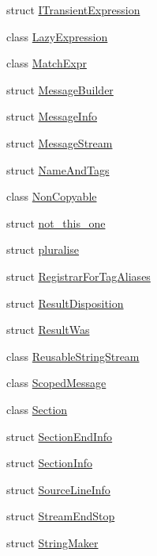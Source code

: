 \begin{DoxyCompactItemize}
\item 
struct \mbox{\hyperlink{struct_catch_1_1_i_transient_expression}{I\+Transient\+Expression}}
\item 
class \mbox{\hyperlink{class_catch_1_1_lazy_expression}{Lazy\+Expression}}
\item 
class \mbox{\hyperlink{class_catch_1_1_match_expr}{Match\+Expr}}
\item 
struct \mbox{\hyperlink{struct_catch_1_1_message_builder}{Message\+Builder}}
\item 
struct \mbox{\hyperlink{struct_catch_1_1_message_info}{Message\+Info}}
\item 
struct \mbox{\hyperlink{struct_catch_1_1_message_stream}{Message\+Stream}}
\item 
struct \mbox{\hyperlink{struct_catch_1_1_name_and_tags}{Name\+And\+Tags}}
\item 
class \mbox{\hyperlink{class_catch_1_1_non_copyable}{Non\+Copyable}}
\item 
struct \mbox{\hyperlink{struct_catch_1_1not__this__one}{not\+\_\+this\+\_\+one}}
\item 
struct \mbox{\hyperlink{struct_catch_1_1pluralise}{pluralise}}
\item 
struct \mbox{\hyperlink{struct_catch_1_1_registrar_for_tag_aliases}{Registrar\+For\+Tag\+Aliases}}
\item 
struct \mbox{\hyperlink{struct_catch_1_1_result_disposition}{Result\+Disposition}}
\item 
struct \mbox{\hyperlink{struct_catch_1_1_result_was}{Result\+Was}}
\item 
class \mbox{\hyperlink{class_catch_1_1_reusable_string_stream}{Reusable\+String\+Stream}}
\item 
class \mbox{\hyperlink{class_catch_1_1_scoped_message}{Scoped\+Message}}
\item 
class \mbox{\hyperlink{class_catch_1_1_section}{Section}}
\item 
struct \mbox{\hyperlink{struct_catch_1_1_section_end_info}{Section\+End\+Info}}
\item 
struct \mbox{\hyperlink{struct_catch_1_1_section_info}{Section\+Info}}
\item 
struct \mbox{\hyperlink{struct_catch_1_1_source_line_info}{Source\+Line\+Info}}
\item 
struct \mbox{\hyperlink{struct_catch_1_1_stream_end_stop}{Stream\+End\+Stop}}
\item 
struct \mbox{\hyperlink{struct_catch_1_1_string_maker}{String\+Maker}}
\item 

\end{DoxyCompactItemize}
